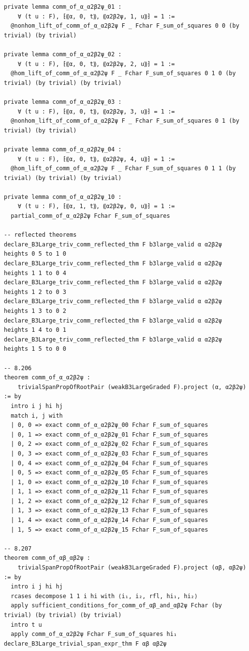 \begin{Verbatim}
private lemma comm_of_α_α2β2ψ_01 :
    ∀ (t u : F), ⁅⸨α, 0, t⸩, ⸨α2β2ψ, 1, u⸩⁆ = 1 :=
  @nonhom_lift_of_comm_of_α_α2β2ψ F _ Fchar F_sum_of_squares 0 0 (by trivial) (by trivial)

private lemma comm_of_α_α2β2ψ_02 :
    ∀ (t u : F), ⁅⸨α, 0, t⸩, ⸨α2β2ψ, 2, u⸩⁆ = 1 :=
  @hom_lift_of_comm_of_α_α2β2ψ F _ Fchar F_sum_of_squares 0 1 0 (by trivial) (by trivial) (by trivial)

private lemma comm_of_α_α2β2ψ_03 :
    ∀ (t u : F), ⁅⸨α, 0, t⸩, ⸨α2β2ψ, 3, u⸩⁆ = 1 :=
  @nonhom_lift_of_comm_of_α_α2β2ψ F _ Fchar F_sum_of_squares 0 1 (by trivial) (by trivial)

private lemma comm_of_α_α2β2ψ_04 :
    ∀ (t u : F), ⁅⸨α, 0, t⸩, ⸨α2β2ψ, 4, u⸩⁆ = 1 :=
  @hom_lift_of_comm_of_α_α2β2ψ F _ Fchar F_sum_of_squares 0 1 1 (by trivial) (by trivial) (by trivial)

private lemma comm_of_α_α2β2ψ_10 :
    ∀ (t u : F), ⁅⸨α, 1, t⸩, ⸨α2β2ψ, 0, u⸩⁆ = 1 :=
  partial_comm_of_α_α2β2ψ Fchar F_sum_of_squares

-- reflected theorems
declare_B3Large_triv_comm_reflected_thm F b3large_valid α α2β2ψ heights 0 5 to 1 0
declare_B3Large_triv_comm_reflected_thm F b3large_valid α α2β2ψ heights 1 1 to 0 4
declare_B3Large_triv_comm_reflected_thm F b3large_valid α α2β2ψ heights 1 2 to 0 3
declare_B3Large_triv_comm_reflected_thm F b3large_valid α α2β2ψ heights 1 3 to 0 2
declare_B3Large_triv_comm_reflected_thm F b3large_valid α α2β2ψ heights 1 4 to 0 1
declare_B3Large_triv_comm_reflected_thm F b3large_valid α α2β2ψ heights 1 5 to 0 0

-- 8.206
theorem comm_of_α_α2β2ψ :
    trivialSpanPropOfRootPair (weakB3LargeGraded F).project (α, α2β2ψ) := by
  intro i j hi hj
  match i, j with
  | 0, 0 => exact comm_of_α_α2β2ψ_00 Fchar F_sum_of_squares
  | 0, 1 => exact comm_of_α_α2β2ψ_01 Fchar F_sum_of_squares
  | 0, 2 => exact comm_of_α_α2β2ψ_02 Fchar F_sum_of_squares
  | 0, 3 => exact comm_of_α_α2β2ψ_03 Fchar F_sum_of_squares
  | 0, 4 => exact comm_of_α_α2β2ψ_04 Fchar F_sum_of_squares
  | 0, 5 => exact comm_of_α_α2β2ψ_05 Fchar F_sum_of_squares
  | 1, 0 => exact comm_of_α_α2β2ψ_10 Fchar F_sum_of_squares
  | 1, 1 => exact comm_of_α_α2β2ψ_11 Fchar F_sum_of_squares
  | 1, 2 => exact comm_of_α_α2β2ψ_12 Fchar F_sum_of_squares
  | 1, 3 => exact comm_of_α_α2β2ψ_13 Fchar F_sum_of_squares
  | 1, 4 => exact comm_of_α_α2β2ψ_14 Fchar F_sum_of_squares
  | 1, 5 => exact comm_of_α_α2β2ψ_15 Fchar F_sum_of_squares

-- 8.207
theorem comm_of_αβ_αβ2ψ :
    trivialSpanPropOfRootPair (weakB3LargeGraded F).project (αβ, αβ2ψ) := by
  intro i j hi hj
  rcases decompose 1 1 i hi with ⟨i₁, i₂, rfl, hi₁, hi₂⟩
  apply sufficient_conditions_for_comm_of_αβ_and_αβ2ψ Fchar (by trivial) (by trivial) (by trivial)
  intro t u
  apply comm_of_α_α2β2ψ Fchar F_sum_of_squares hi₁
declare_B3Large_trivial_span_expr_thm F αβ αβ2ψ


\end{Verbatim}
